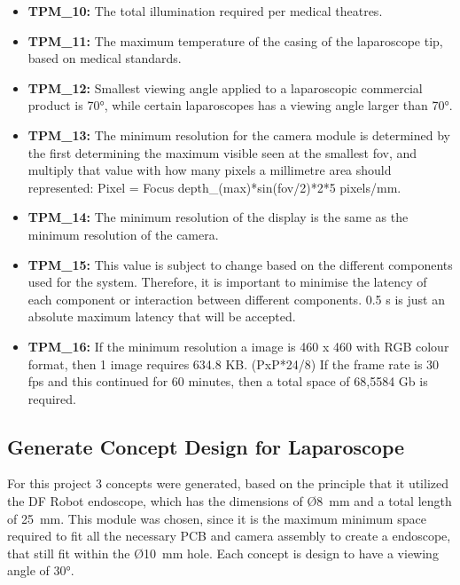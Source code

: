 \begin{itemize}
    \item\textbf{TPM\_10:} The total illumination required per medical theatres.
    
    \item\textbf{TPM\_11:} The maximum temperature of the casing of the laparoscope tip, based on medical standards.

    \item\textbf{TPM\_12:} Smallest viewing angle applied to a laparoscopic commercial product is 70°,  while certain laparoscopes has a viewing angle larger than 70°.

    \item\textbf{TPM\_13:} The minimum resolution for the camera module is determined by the first determining the maximum visible seen at the smallest fov, and multiply that value with how many pixels a millimetre area should represented: Pixel = Focus depth\_(max)*sin(fov/2)*2*5 pixels/mm.

    \item\textbf{TPM\_14:} The minimum resolution of the display is the same as the minimum resolution of the camera.

    \item\textbf{TPM\_15:} This value is subject to change based on the different components used for the system. Therefore, it is important to minimise the latency of each component or interaction between different components. 0.5 s is just an absolute maximum latency that will be accepted.

    \item\textbf{TPM\_16:} If the minimum resolution a image is 460 x 460 with RGB colour format, then 1 image requires 634.8 KB. (PxP*24/8) If the frame rate is 30 fps and this continued for 60 minutes, then a total space of 68,5584 Gb is required.

\end{itemize}
\subsection{Generate Concept Design for Laparoscope}

For this project 3 concepts were generated, based on the principle that it utilized the DF Robot endoscope, which has the dimensions of Ø8~mm and a total length of 25~mm. This module was chosen, since it is the maximum minimum space required to fit all the necessary PCB and camera assembly to create a endoscope, that still fit within the Ø10~mm hole. Each concept is design to have a viewing angle of 30°.

